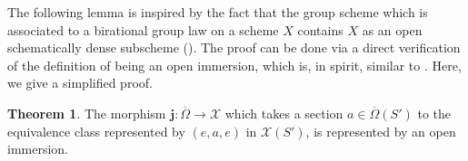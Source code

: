 \documentclass[11pt, reqno]{amsart}
\theoremstyle{plain}
\theoremstyle{definition}
\newtheorem{theorem}{Theorem}[section]
\begin{document}
The following lemma is inspired by the fact that the group scheme which is associated to a birational group law on a scheme $X$ contains $X$ as an open schematically dense subscheme (\cite[exposé~XVIII, théorème~3.7 (ii)]{SGA3II}). 
The proof can be done via a direct verification of the definition of being an open immersion, which is, in spirit, similar to \cite[Lemma~3.13]{groupschemeoutofbirationallaw}. Here, we give a simplified proof.

\begin{theorem}\label{representedopenimmer}
    The morphism $\mathbf{j}\colon \overline{\Omega}\rightarrow \mathcal{X}$ which takes a section $a\in\overline{\Omega}(S')$ to the equivalence class represented by $(e,a,e)$ in $\mathcal{X}(S')$, is represented by an open immersion.
\end{theorem}
\end{document}
